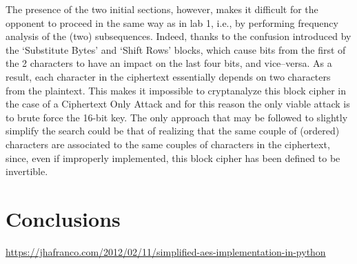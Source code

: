 \documentclass[12pt]{article}
\begin{document}
The presence of the two initial sections, however, makes it difficult for the opponent to proceed in the same way as in lab 1, i.e., by performing frequency analysis of the (two) subsequences. Indeed, thanks to the confusion introduced by the `Substitute Bytes' and `Shift Rows' blocks, which cause bits from the first of the 2 characters to have an impact on the last four bits, and vice–versa.
As a result, each character in the ciphertext essentially depends on two characters from the plaintext.
This makes it impossible to cryptanalyze this block cipher in the case of a Ciphertext Only Attack and for this reason the only viable attack is to brute force the 16-bit key.
The only approach that may be followed to slightly simplify the search could be that of realizing that the same couple of (ordered) characters are associated to the same couples of characters in the ciphertext, since, even if improperly implemented, this block cipher has been defined to be invertible.

\section{Conclusions}
\label{sec:04}

\begin{thebibliography}{5}
    \url{https://jhafranco.com/2012/02/11/simplified-aes-implementation-in-python}
\end{thebibliography}
\end{document}

